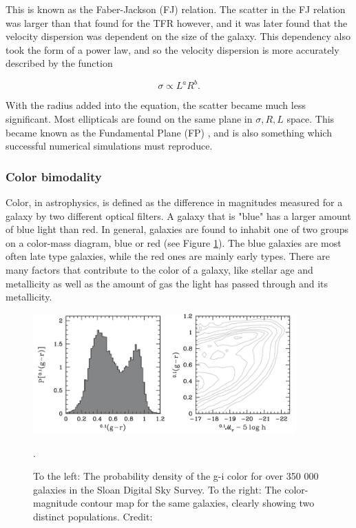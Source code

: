 This is known as the Faber-Jackson (FJ) relation. The scatter in the FJ relation was larger than that found for the TFR however, and it was later found that the velocity dispersion was dependent on the size of the galaxy. This dependency also took the form of a power law, and so the velocity dispersion is more accurately described by the function

\begin{equation}
    \sigma \propto L^a R^b.
\end{equation}

With the radius added into the equation, the scatter became much less significant. Most ellipticals are found on the same plane in ${\sigma, R, L}$ space. This became known as the Fundamental Plane (FP) \parencite{Djorgovski1987}, and is also something which successful numerical simulations must reproduce.

\subsubsection{Color bimodality}
Color, in astrophysics, is defined as the difference in magnitudes measured for a galaxy by two different optical filters. A galaxy that is "blue" has a larger amount of blue light than red. In general, galaxies are found to inhabit one of two groups on a color-mass diagram, blue or red (see Figure \ref{color_bimodality}). The blue galaxies are most often late type galaxies, while the red ones are mainly early types. There are many factors that contribute to the color of a galaxy, like stellar age and metallicity as well as the amount of gas the light has passed through and its metallicity.

\begin{figure}
    \centering
    \includegraphics[width=0.9\textwidth]{images/color_bimodality.png}
    \caption{To the left: The probability density of the g-i color for over 350 000 galaxies in the Sloan Digital Sky Survey. To the right: The color-magnitude contour map for the same galaxies, clearly showing two distinct populations. Credit: \textcite{Mo2010}}.
    \label{color_bimodality}
\end{figure}

